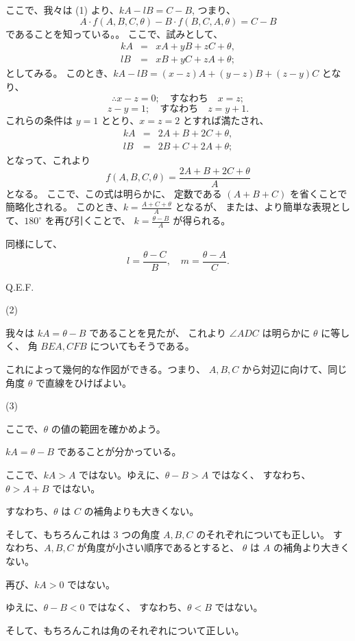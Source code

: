 ここで、我々は (1) より、$kA - lB = C - B$, つまり、
\[
A \cdot f(A, B, C, \theta) - B \cdot f(B, C, A, \theta) = C - B
\]
であることを知っている。。
ここで、試みとして、
\begin{eqnarray*}
k A &=& xA + yB + zC + \theta,\\
l B &=& xB + yC + zA + \theta;
\end{eqnarray*}
としてみる。
このとき、$kA - lB = (x-z)A + (y-z)B + (z-y)C$ となり、
\[
\therefore
x - z = 0;
\quad
\mbox{すなわち}
\quad x = z;
\]
\[
z - y = 1;
\quad
\mbox{すなわち}
\quad z = y + 1.
\]
これらの条件は $y = 1$  ととり、$x = z = 2$ とすれば満たされ、
\begin{eqnarray*}
kA &=& 2A + B + 2C + \theta,\\
lB &=& 2B + C + 2A + \theta;
\end{eqnarray*}
となって、これより
\[
f(A, B, C, \theta) = \frac{2A + B + 2C + \theta}{A}
\]
となる。
ここで、この式は明らかに、
定数である $(A + B + C)$ を省くことで簡略化される。
このとき、$k = \frac{A+C+\theta}{A}$ となるが、
または、より簡単な表現として、$180^\circ$  を再び引くことで、
$k = \frac{\theta - B}{A}$ が得られる。

同様にして、
\[
l = \frac{\theta - C}{B},
\quad
m = \frac{\theta - A}{C}.
\]

Q.E.F.

(2)

我々は $kA = \theta - B$ であることを見たが、
これより $\angle ADC$ は明らかに $\theta$ に等しく、
角 $BEA, CFB$ についてもそうである。

これによって幾何的な作図ができる。つまり、
$A, B, C$ から対辺に向けて、同じ角度 $\theta$ で直線をひけばよい。

(3)

ここで、$\theta$ の値の範囲を確かめよう。

$kA = \theta - B$ であることが分かっている。

ここで、$kA > A$ ではない。ゆえに、$\theta - B > A$ ではなく、
すなわち、$\theta > A + B$ ではない。

すなわち、$\theta$ は $C$ の補角よりも大きくない。

そして、もちろんこれは 3 つの角度 $A, B, C$
のそれぞれについても正しい。
すなわち、$A, B, C$ が角度が小さい順序であるとすると、
$\theta$ は $A$ の補角より大きくない。

再び、$kA > 0$ ではない。

ゆえに、$\theta - B < 0$ ではなく、
すなわち、$\theta < B$ ではない。

そして、もちろんこれは角のそれぞれについて正しい。

